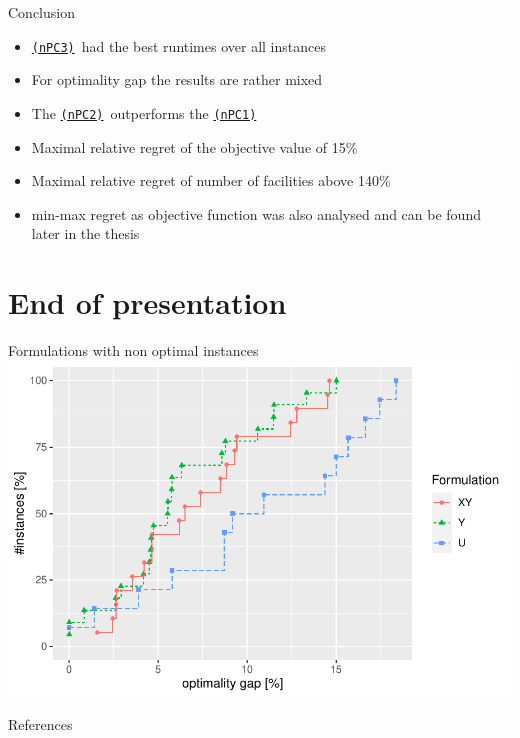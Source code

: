 \documentclass[utf8,aspectratio=169,ngerman,english]{beamer}
\newcommand{\nPC}{\hyperref[eq:nPC]{\texttt{(nPC1)}}}
\newcommand{\nPCY}{\hyperref[eq:nPCY]{\texttt{(nPC2)}}}
\newcommand{\nPCE}{\hyperref[eq:nPCE]{\texttt{(nPC3)}}}
\begin{document}
\begin{frame}{Conclusion}
    \begin{itemize}
        \item \nPCE\ had the best runtimes over all instances
        \item For optimality gap the results are rather mixed
        \item The \nPCY\ outperforms the \nPC
        \item Maximal relative regret of the objective value of 15\%
        \item Maximal relative regret of number of facilities above 140\%
        \item min-max regret as objective function was also analysed and can be found later in the thesis
    \end{itemize}
\end{frame}


\maketitle

\section*{End of presentation}

\begin{frame}{Formulations with non optimal instances}
    \centering
    \includegraphics[width = .65\linewidth, keepaspectratio]{images/gap_models_sH_nopt.pdf}
\end{frame}

\begin{frame}[allowframebreaks]{References}
    \printbibliography
\end{frame}
\end{document}
